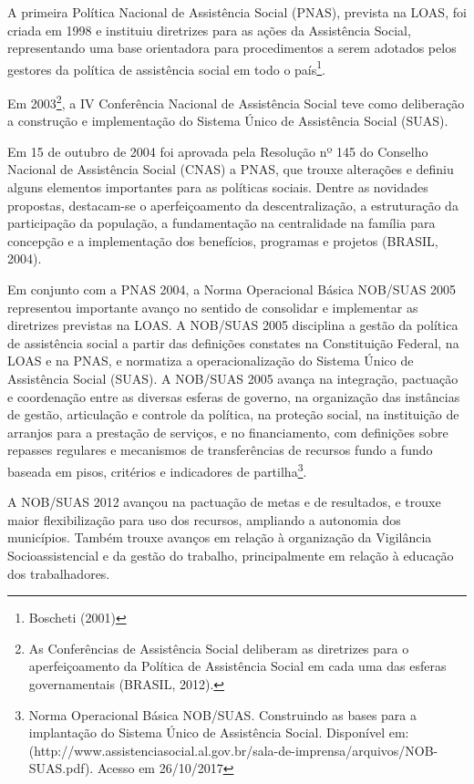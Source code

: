 \documentclass[
  brazilian]{report}
\begin{document}
A primeira Política Nacional de Assistência Social (PNAS), prevista na
LOAS, foi criada em 1998 e instituiu diretrizes para as ações da
Assistência Social, representando uma base orientadora para
procedimentos a serem adotados pelos gestores da política de assistência
social em todo o país\footnote{Boscheti (2001)}.

Em
2003\footnote{As Conferências de Assistência Social deliberam as diretrizes para o aperfeiçoamento da Política de Assistência Social em cada uma das esferas governamentais (BRASIL, 2012).},
a IV Conferência Nacional de Assistência Social teve como deliberação a
construção e implementação do Sistema Único de Assistência Social
(SUAS).

Em 15 de outubro de 2004 foi aprovada pela Resolução nº 145 do Conselho
Nacional de Assistência Social (CNAS) a PNAS, que trouxe alterações e
definiu alguns elementos importantes para as políticas sociais. Dentre
as novidades propostas, destacam-se o aperfeiçoamento da
descentralização, a estruturação da participação da população, a
fundamentação na centralidade na família para concepção e a
implementação dos benefícios, programas e projetos (BRASIL, 2004).

Em conjunto com a PNAS 2004, a Norma Operacional Básica NOB/SUAS 2005
representou importante avanço no sentido de consolidar e implementar as
diretrizes previstas na LOAS. A NOB/SUAS 2005 disciplina a gestão da
política de assistência social a partir das definições constates na
Constituição Federal, na LOAS e na PNAS, e normatiza a operacionalização
do Sistema Único de Assistência Social (SUAS). A NOB/SUAS 2005 avança na
integração, pactuação e coordenação entre as diversas esferas de
governo, na organização das instâncias de gestão, articulação e controle
da política, na proteção social, na instituição de arranjos para a
prestação de serviços, e no financiamento, com definições sobre repasses
regulares e mecanismos de transferências de recursos fundo a fundo
baseada em pisos, critérios e indicadores de
partilha\footnote{Norma Operacional Básica NOB/SUAS. Construindo as bases para a implantação do Sistema Único de Assistência Social. Disponível em:  (http://www.assistenciasocial.al.gov.br/sala-de-imprensa/arquivos/NOB-SUAS.pdf). Acesso em 26/10/2017}.

A NOB/SUAS 2012 avançou na pactuação de metas e de resultados, e trouxe
maior flexibilização para uso dos recursos, ampliando a autonomia dos
municípios. Também trouxe avanços em relação à organização da Vigilância
Socioassistencial e da gestão do trabalho, principalmente em relação à
educação dos trabalhadores.
\end{document}

